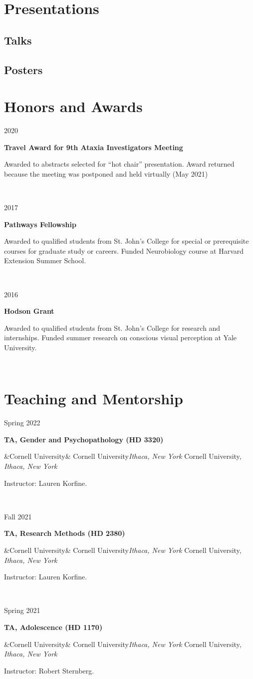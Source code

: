 \documentclass{article}
\newcommand{\entry}[5]{

  \begin{minipage}[t]{.15\textwidth}
    \begin{flushright}
      \hfill {#1}
    \end{flushright}
  \end{minipage}
  \hfill\vline\hfill
  \begin{minipage}[t]{.80\textwidth}
    \textbf{#2}

    \ifx&#3&
      {#3}\textit{#4}
    \else
      {#3, }\textit{#4}

    \fi
    \footnotesize{#5}
  \end{minipage}\\\vspace{.25cm}
}
\newcommand{\awardentry}[3]{
  \begin{minipage}[t]{.15\textwidth}
    \begin{flushright}
      \hfill {#1}
    \end{flushright}
  \end{minipage}
  \hfill\vline\hfill
  \begin{minipage}[t]{.80\textwidth}
    \textbf{#2}

    \footnotesize{#3}
  \end{minipage}\\\vspace{.25cm}
}
\newcommand{\cu}{Cornell University}
\begin{document}

\section{Presentations}

\subsection{Talks}
\newrefsection[talks]
\nocite{*}
\printbibliography[heading=none]

\subsection{Posters}
\newrefsection[posters]
\nocite{*}
\printbibliography[heading=none]


\section{Honors and Awards}

\awardentry{2020}{Travel Award for 9th Ataxia Investigators Meeting}
{Awarded to abstracts selected for “hot chair” presentation. Award returned because the meeting was postponed and held virtually (May 2021)}

\awardentry{2017}{Pathways Fellowship}
{Awarded to qualified students from St. John’s College for special or prerequisite courses for graduate study or careers. Funded Neurobiology course at Harvard Extension Summer School.}

\awardentry{2016 }{Hodson Grant}
{Awarded to qualified students from St. John’s College for research and internships. Funded summer research on conscious visual perception at Yale University.}

\section{Teaching and Mentorship}

\entry{Spring 2022}{TA, Gender and Psychopathology (HD 3320)}
{\cu}{Ithaca, New York}
{Instructor: Lauren Korfine.}

\entry{Fall 2021}{TA, Research Methods (HD 2380)}
{\cu}{Ithaca, New York}
{Instructor: Lauren Korfine.}

\entry{Spring 2021}{TA, Adolescence (HD 1170)}
{\cu}{Ithaca, New York}
{Instructor: Robert Sternberg.}
\end{document}
